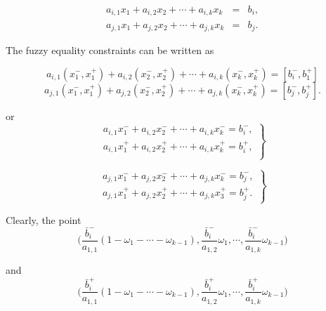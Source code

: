 \documentclass{iaesarticle3}
\begin{document}
\begin{eqnarray}\label{eqn3}
  a_{i,1}x_1 + a_{i,2}x_2 + \cdots + a_{i,k}x_k &=& b_i, \\
  \label{eqn4}
  a_{j,1}x_1 + a_{j,2}x_2 + \cdots + a_{j,k}x_k &=& b_j.
\end{eqnarray}

The fuzzy equality constraints can be written as

\begin{equation}\label{eqn5}
    a_{i,1} (x_1^-,x_1^+) + a_{i,2}(x_2^-,x_2^+) + \cdots + a_{i,k}(x_k^-,x_k^+) = [b_i^-,b_1^+]
\end{equation}
\begin{equation}\label{eqn6}
    a_{j,1} (x_1^-,x_1^+) + a_{j,2}(x_2^-,x_2^+) + \cdots + a_{j,k}(x_k^-,x_k^+) = [b_j^-,b_j^+].
\end{equation}

\noindent or
\begin{equation}\label{eqn7}
    \left.\begin{array}{l}
        a_{i,1} x_1^- + a_{i,2}x_2^- + \cdots + a_{i,k}x_k^- = b_i^-, \\
        a_{i,1} x_1^+ + a_{i,2}x_2^+ + \cdots + a_{i,k}x_k^+ = b_i^+, \\
    \end{array}\right\}
\end{equation}

\begin{equation}\label{eqn8}
    \left.\begin{array}{l}
        a_{j,1}x_1^- + a_{j,2}x_2^- + \cdots + a_{j,k}x_k^- = b_j^-, \\
        a_{j,1}x_1^+ + a_{j,2}x_2^+ + \cdots + a_{j,k}x_3^+ = b_j^+.
    \end{array}\right\}
\end{equation}


Clearly, the point
\begin{equation}\label{pers10}
    \bigg(\frac{\bar{b}_i^-}{a_{1,1}}(1 - \omega_1 - \cdots - \omega_{k-1}), \frac{\bar{b}_i^-}{a_{1,2}}\omega_1, \cdots, \frac{\bar{b}_i^-}{a_{1,k}}\omega_{k-1}\bigg)
\end{equation}

\noindent and
\begin{equation}\label{pers10a}
    \bigg(\frac{\bar{b}_i^+}{a_{1,1}}(1 - \omega_1 - \cdots - \omega_{k-1}), \frac{\bar{b}_i^+}{a_{1,2}}\omega_1, \cdots, \frac{\bar{b}_i^+}{a_{1,k}}\omega_{k-1}\bigg)
\end{equation}
\end{document}
